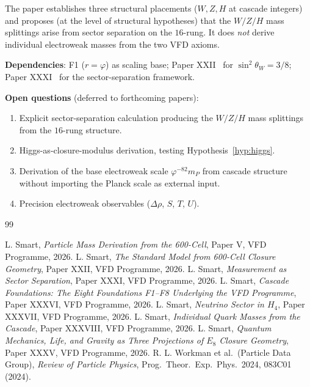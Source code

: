 \documentclass[12pt]{article}
\theoremstyle{definition}
\theoremstyle{remark}
\begin{document}
The paper establishes three structural placements ($W, Z, H$ at cascade integers) and proposes (at the level of structural hypotheses) that the $W/Z/H$ mass splittings arise from sector separation on the $16$-rung. It does \emph{not} derive individual electroweak masses from the two VFD axioms.

\textbf{Dependencies}: F1 ($r = \varphi$) as scaling base; Paper XXII~\citep{SmartXXII} for $\sin^2\theta_W = 3/8$; Paper XXXI~\citep{SmartXXXI} for the sector-separation framework.

\textbf{Open questions} (deferred to forthcoming papers):
\begin{enumerate}
\item Explicit sector-separation calculation producing the $W/Z/H$ mass splittings from the $16$-rung structure.
\item Higgs-as-closure-modulus derivation, testing Hypothesis~\ref{hyp:higgs}.
\item Derivation of the base electroweak scale $\varphi^{-82} m_P$ from cascade structure without importing the Planck scale as external input.
\item Precision electroweak observables ($\Delta \rho$, $S$, $T$, $U$).
\end{enumerate}


\begin{thebibliography}{99}

 L. Smart, \emph{Particle Mass Derivation from the 600-Cell}, Paper V, VFD Programme, 2026.
 L. Smart, \emph{The Standard Model from 600-Cell Closure Geometry}, Paper XXII, VFD Programme, 2026.
 L. Smart, \emph{Measurement as Sector Separation}, Paper XXXI, VFD Programme, 2026.
 L. Smart, \emph{Cascade Foundations: The Eight Foundations F1--F8 Underlying the VFD Programme}, Paper XXXVI, VFD Programme, 2026.
 L. Smart, \emph{Neutrino Sector in $H_4$}, Paper XXXVII, VFD Programme, 2026.
 L. Smart, \emph{Individual Quark Masses from the Cascade}, Paper XXXVIII, VFD Programme, 2026.
 L. Smart, \emph{Quantum Mechanics, Life, and Gravity as Three Projections of $E_8$ Closure Geometry}, Paper XXXV, VFD Programme, 2026.
 R. L. Workman et al.\ (Particle Data Group), \emph{Review of Particle Physics}, Prog.\ Theor.\ Exp.\ Phys.\ 2024, 083C01 (2024).

\end{thebibliography}
\end{document}
